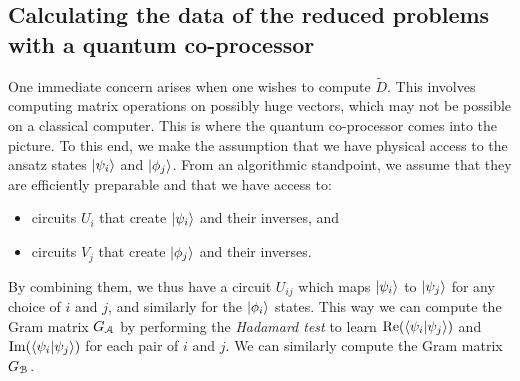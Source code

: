 
\subsection{Calculating the data of the reduced problems with a quantum co-processor} \label{ss:ch2_SEP-q_co_proc}
 
One immediate concern arises when one wishes to compute $\tilde{D}$. 
This involves computing matrix operations on possibly huge vectors, which may not be possible on a classical computer. 
This is where the quantum co-processor comes into the picture. 
To this end, we make the assumption that we have physical access to the ansatz states $\ket{\psi_i}$ and $\ket{\phi_j}$. 
From an algorithmic standpoint, we assume that they are efficiently preparable and that we have access to: 
\begin{itemize} 
\item circuits $U_i$ that create $\ket{\psi_i}$ and their inverses, and 
\item circuits $V_j$ that create $\ket{\phi_j}$ and their inverses. 
\end{itemize} 
By combining them, we thus have a circuit $U_{ij}$ which maps $\ket{\psi_i}$ to $\ket{\psi_j}$ for any choice of $i$ and $j$, and similarly for the $\ket{\phi_i}$ states.  
This way we can compute the Gram matrix $G_{\mathcal{A}}$ by performing the \emph{Hadamard test} to learn $\mathrm{Re}(\braket{\psi_i}{\psi_j})$ and $\mathrm{Im}(\braket{\psi_i}{\psi_j})$ for each pair of $i$ and $j$. 
We can similarly compute the Gram matrix $G_{\mathcal{B}}$. 

